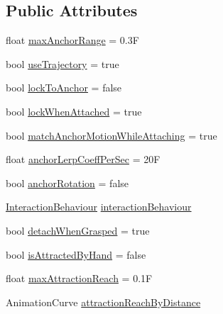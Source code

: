 \subsection*{Public Attributes}
\begin{DoxyCompactItemize}
\item 
float \mbox{\hyperlink{class_leap_1_1_unity_1_1_interaction_1_1_anchorable_behaviour_a894d0a63d373fe4cebaf382daef1c940}{max\+Anchor\+Range}} = 0.\+3F
\item 
bool \mbox{\hyperlink{class_leap_1_1_unity_1_1_interaction_1_1_anchorable_behaviour_ab05fef36f601748387b8a283433909f3}{use\+Trajectory}} = true
\item 
bool \mbox{\hyperlink{class_leap_1_1_unity_1_1_interaction_1_1_anchorable_behaviour_a639dc5b718626a5ab76777eb8d2a24a2}{lock\+To\+Anchor}} = false
\item 
bool \mbox{\hyperlink{class_leap_1_1_unity_1_1_interaction_1_1_anchorable_behaviour_a06a27a8ca63c701cfea9f99ee512d293}{lock\+When\+Attached}} = true
\item 
bool \mbox{\hyperlink{class_leap_1_1_unity_1_1_interaction_1_1_anchorable_behaviour_ae08e06de9abe0fe650acd8f1f1c31f74}{match\+Anchor\+Motion\+While\+Attaching}} = true
\item 
float \mbox{\hyperlink{class_leap_1_1_unity_1_1_interaction_1_1_anchorable_behaviour_a4f5df5a27d79d1ffcbbcdfb80da57274}{anchor\+Lerp\+Coeff\+Per\+Sec}} = 20F
\item 
bool \mbox{\hyperlink{class_leap_1_1_unity_1_1_interaction_1_1_anchorable_behaviour_a6e8db2d74a39b3647c7019c1c7ee92d5}{anchor\+Rotation}} = false
\item 
\mbox{\hyperlink{class_leap_1_1_unity_1_1_interaction_1_1_interaction_behaviour}{Interaction\+Behaviour}} \mbox{\hyperlink{class_leap_1_1_unity_1_1_interaction_1_1_anchorable_behaviour_aa067c979e2602b16f03103c18de20a92}{interaction\+Behaviour}}
\item 
bool \mbox{\hyperlink{class_leap_1_1_unity_1_1_interaction_1_1_anchorable_behaviour_a3cffb103b9353e00207cea037e2054a0}{detach\+When\+Grasped}} = true
\item 
bool \mbox{\hyperlink{class_leap_1_1_unity_1_1_interaction_1_1_anchorable_behaviour_a85262d2cae0fd2ab5291d18406868c48}{is\+Attracted\+By\+Hand}} = false
\item 
float \mbox{\hyperlink{class_leap_1_1_unity_1_1_interaction_1_1_anchorable_behaviour_a71b2fb0a2dba4935795a00a88f15bf1a}{max\+Attraction\+Reach}} = 0.\+1F
\item 
Animation\+Curve \mbox{\hyperlink{class_leap_1_1_unity_1_1_interaction_1_1_anchorable_behaviour_a8ff2f11921e25a9a278de2cf09f8499f}{attraction\+Reach\+By\+Distance}}

\end{DoxyCompactItemize}
